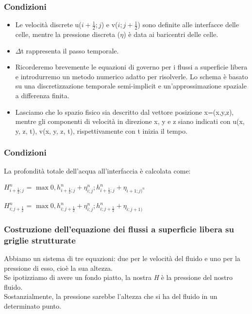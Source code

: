 \documentclass{beamer}
\begin{document}
	\begin{frame}
		\frametitle{Condizioni}
			\begin{itemize}
				\item Le velocità discrete u($i+\frac{1}{2} ; j $) e v($ i ; j+\frac{1}{2}$) sono definite alle interfacce delle celle, mentre la pressione discreta ($\eta$) è data ai baricentri delle celle.\\
				\item $\Delta$t rappresenta il passo temporale.
				\smallskip
				
				\item Ricorderemo brevemente le equazioni di governo per i flussi a superficie libera e introdurremo un metodo numerico adatto per risolverle. Lo schema è basato su una discretizzazione temporale semi-implicit e un'approssimazione spaziale a differenza finita.
				\item Lasciamo che lo spazio fisico sia descritto dal vettore posizione x=(x,y,z), mentre gli componenti di velocità in direzione x, y e z siano indicati con u(x, y, z, t), v(x, y, z, t), rispettivamente con t inizia il tempo.
			\end{itemize}
	\end{frame}
	
	\begin{frame}
		\frametitle{Condizioni}
			La profondità totale dell'acqua all'interfaccia è calcolata come: 
	
		\begin{center}
			$ H_{i+\frac{1}{2};j}^{n} $ = $  \max { 0, h_{i + \frac{1}{2}; j}^{n} + \eta_{i;j}^{n} ; h_{i+\frac{1}{2}; j}^{n} + \eta_{i+1;j)^{n} } } $
			
			$ H_{i; j+\frac{1}{2}}^{n} $ = $ \max { 0 , h_{i; j+\frac{1}{2}}^{n} + \eta_{i;j}^{n}; h_{i; j+\frac{1}{2}}^{n}+ \eta_{i; j+1)} } $
		\end{center}
	
			
	\end{frame}
	
	\begin{frame}
		\frametitle{Costruzione dell'equazione dei flussi a superficie libera su griglie strutturate }
			
			Abbiamo un sistema di tre equazioni: due per le velocità del fluido e uno per la pressione di esso, cioè la sua altezza. \\
			Se ipotizziamo di avere un fondo piatto, la nostra \emph{H} è la pressione del nostro fluido.\\
			Sostanzialmente, la pressione sarebbe l'altezza che si ha del fluido in un determinato punto.\\

	\end{frame}
\end{document}
